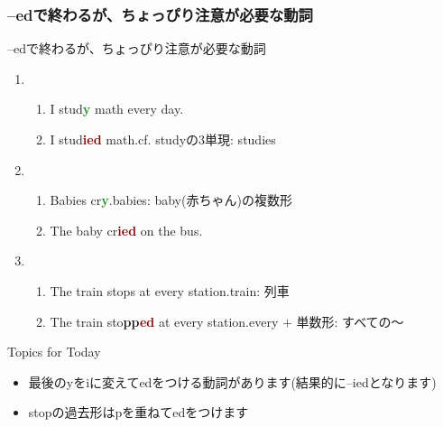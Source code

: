 \documentclass[aspectratio=169,xcolor={dvipsnames,table}]{beamer}
\newcommand{\myaudio}[1]{\href{#1}{\faVolumeUp}}
\begin{document}
\subsubsection{--edで終わるが、ちょっぴり注意が必要な動詞}
\begin{frame}[plain]{--edで終わるが、ちょっぴり注意が必要な動詞}
 \pause
\begin{enumerate}
 \item \begin{enumerate}
	\item I stud\textcolor{ForestGreen}{\bfseries y} math every day.\pause
	\item I stud\textcolor{Maroon}{\bfseries ied} math.\hfill{}{{\scriptsize cf. studyの3単現: studies}}\pause
       \end{enumerate}
 \item \begin{enumerate}
	\item Babies cr\textcolor{ForestGreen}{\bfseries y}.\hfill{}{{\scriptsize  babies: baby(赤ちゃん)の複数形}}\pause
	\item The baby cr\textcolor{Maroon}{\bfseries ied} on the bus.\pause
       \end{enumerate}
 \item \begin{enumerate}
	\item The train stops at every station.\hfill{}{{\scriptsize train: 列車}}\pause
	\item The train sto\textcolor{NavyBlue}{\bfseries pp}\textcolor{Maroon}{\bfseries ed} at every station.\hfill{}{{\scriptsize every $+$ 単数形: すべての～ }}\pause
       \end{enumerate}
\end{enumerate}

\begin{exampleblock}{Topics for Today}\small
\begin{itemize}[square]
 \item 最後のyをiに変えてedをつける動詞があります(結果的に--iedとなります)\pause
 \item stopの過去形はpを重ねてedをつけます
\end{itemize}
\end{exampleblock}
\hfill\myaudio{./audio/025_past_do_08.mp3}

\end{frame}
\end{document}
